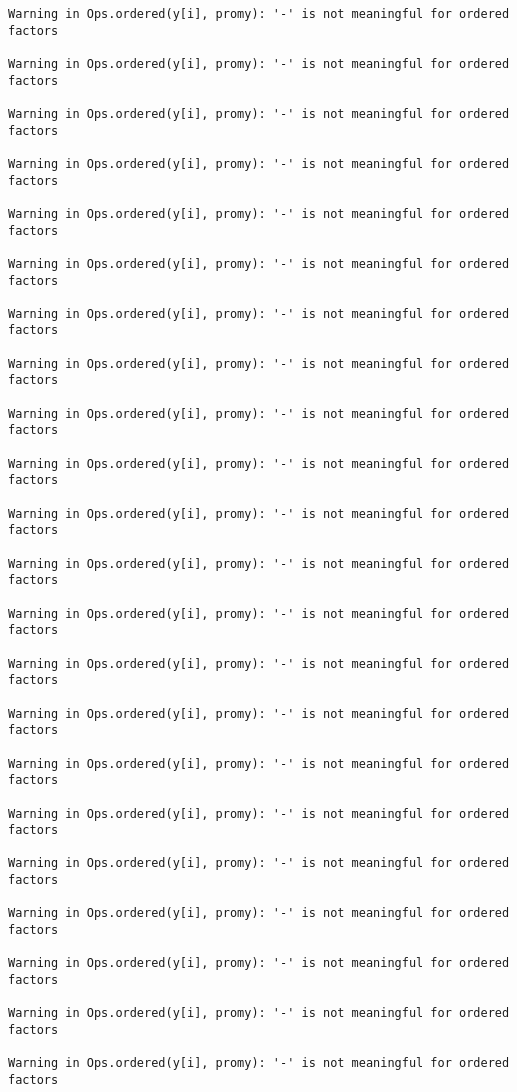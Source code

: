 \documentclass[]{article}
\begin{document}
\begin{verbatim}
Warning in Ops.ordered(y[i], promy): '-' is not meaningful for ordered
factors

Warning in Ops.ordered(y[i], promy): '-' is not meaningful for ordered
factors

Warning in Ops.ordered(y[i], promy): '-' is not meaningful for ordered
factors

Warning in Ops.ordered(y[i], promy): '-' is not meaningful for ordered
factors

Warning in Ops.ordered(y[i], promy): '-' is not meaningful for ordered
factors

Warning in Ops.ordered(y[i], promy): '-' is not meaningful for ordered
factors

Warning in Ops.ordered(y[i], promy): '-' is not meaningful for ordered
factors

Warning in Ops.ordered(y[i], promy): '-' is not meaningful for ordered
factors

Warning in Ops.ordered(y[i], promy): '-' is not meaningful for ordered
factors

Warning in Ops.ordered(y[i], promy): '-' is not meaningful for ordered
factors

Warning in Ops.ordered(y[i], promy): '-' is not meaningful for ordered
factors

Warning in Ops.ordered(y[i], promy): '-' is not meaningful for ordered
factors

Warning in Ops.ordered(y[i], promy): '-' is not meaningful for ordered
factors

Warning in Ops.ordered(y[i], promy): '-' is not meaningful for ordered
factors

Warning in Ops.ordered(y[i], promy): '-' is not meaningful for ordered
factors

Warning in Ops.ordered(y[i], promy): '-' is not meaningful for ordered
factors

Warning in Ops.ordered(y[i], promy): '-' is not meaningful for ordered
factors

Warning in Ops.ordered(y[i], promy): '-' is not meaningful for ordered
factors

Warning in Ops.ordered(y[i], promy): '-' is not meaningful for ordered
factors

Warning in Ops.ordered(y[i], promy): '-' is not meaningful for ordered
factors

Warning in Ops.ordered(y[i], promy): '-' is not meaningful for ordered
factors

Warning in Ops.ordered(y[i], promy): '-' is not meaningful for ordered
factors


\end{verbatim}
\end{document}
